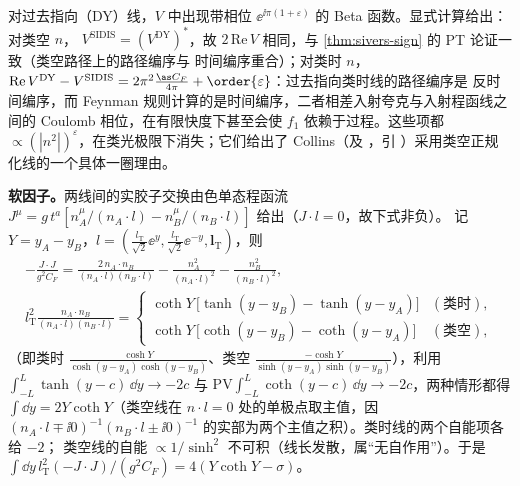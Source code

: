 \begin{example}
\begin{remark}[类时线与类空线]
\label{rem:timelike-lines}
对过去指向（DY）线，$V$ 中出现带相位 $\ee^{\ii\pi(1+\varepsilon)}$ 的 Beta 函数。显式计算给出：对类空 $n$，
$V^{\mathrm{SIDIS}}=(V^{\mathrm{DY}})^*$，故 $2\,\mathrm{Re}\,V$ 相同，与 \cref{thm:sivers-sign} 的 PT 论证一致（类空路径上的路径编序与
时间编序重合）；对类时 $n$，$\mathrm{Re}\,V^{\mathrm{DY}}-V^{\mathrm{SIDIS}}=2\pi^2\frac{\as C_F}{4\pi}+\order{\varepsilon}$：过去指向类时线的路径编序是
反时间编序，而 Feynman 规则计算的是时间编序，二者相差入射夸克与入射程函线之间的 Coulomb 相位，在有限快度下甚至会使 $f_1$
依赖于过程。这些项都 $\propto(|n^2|)^\varepsilon$，在类光极限下消失；它们给出了 Collins\cite{Collins2011}（及
\cite{AybatRogers2011}，引 \cite{CollinsMetz2004}）采用类空正规化线的一个具体一圈理由。
\end{remark}

\textbf{软因子。}两线间的实胶子交换由色单态程函流 $J^\mu=g\,t^a[n_A^\mu/(n_A\cdot l)-n_B^\mu/(n_B\cdot l)]$ 给出（$J\cdot l=0$，故下式非负）。
记 $Y=y_A-y_B$，$l=(\tfrac{l_{\mathrm T}}{\sqrt2}\ee^{y},\tfrac{l_{\mathrm T}}{\sqrt2}\ee^{-y},\boldsymbol l_{\mathrm T})$，则
\begin{equation}
  \begin{gathered}
  -\frac{J\cdot J}{g^2C_F}=\frac{2\,n_A\cdot n_B}{(n_A\cdot l)(n_B\cdot l)}-\frac{n_A^2}{(n_A\cdot l)^2}-\frac{n_B^2}{(n_B\cdot l)^2},\\
  l_{\mathrm T}^2\frac{n_A\cdot n_B}{(n_A\cdot l)(n_B\cdot l)}=
  \begin{cases}
   \coth Y\,\big[\tanh(y-y_B)-\tanh(y-y_A)\big] & (\text{类时}),\\[1ex]
   \coth Y\,\big[\coth(y-y_B)-\coth(y-y_A)\big] & (\text{类空}),
  \end{cases}
  \end{gathered}
  \label{eq:soft-rapidity-integrand}
\end{equation}
（即类时 $\frac{\cosh Y}{\cosh(y-y_A)\cosh(y-y_B)}$、类空 $\frac{-\cosh Y}{\sinh(y-y_A)\sinh(y-y_B)}$），利用 $\int_{-L}^{L}\tanh(y-c)\,\dd y\to-2c$ 与 $\mathrm{PV}\!\int_{-L}^{L}\coth(y-c)\,\dd y\to-2c$，两种情形都得 $\int\dd y=2Y\coth Y$（类空线在
$n\cdot l=0$ 处的单极点取主值，因 $(n_A\cdot l\mp\ii0)^{-1}(n_B\cdot l\pm\ii0)^{-1}$ 的实部为两个主值之积）。类时线的两个自能项各给 $-2$；
类空线的自能 $\propto1/\sinh^2$ 不可积（线长发散，属“无自作用”）。于是 $\int\dd y\,l_{\mathrm T}^2(-J\cdot J)/(g^2C_F)=4(Y\coth Y-\sigma)$。


\end{example}
